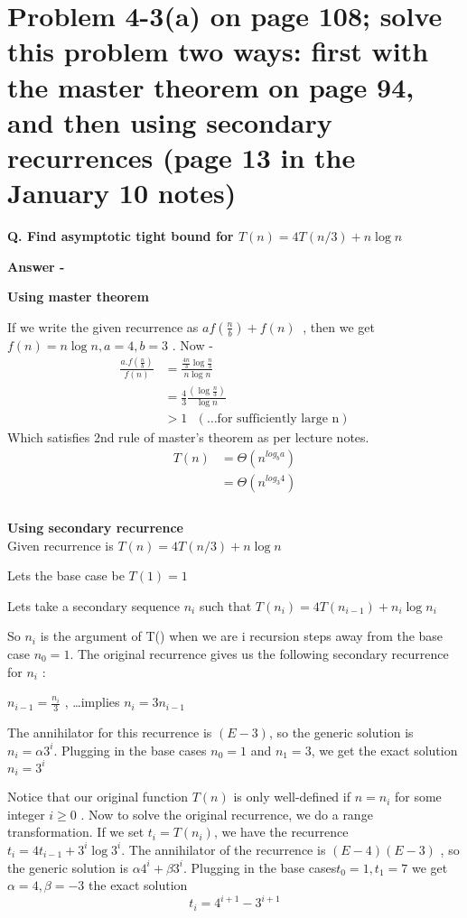 \documentclass[5pt]{article}
\begin{document}
\section{Problem 4-3(a) on page 108; solve this problem two ways: first with the master theorem on page 94, and then using secondary recurrences (page 13 in the January 10 notes)}
\textbf{Q. Find asymptotic tight bound for $T(n) = 4T(n/3) + n\log n $}

\setlength{\parskip}{1.2em}
\setlength{\parindent}{0em}

\textbf{Answer -}

\textbf{ Using master theorem } 

If we write the given recurrence as $ af(\frac n b) + f(n) \ $ , then we get $ f(n) = n \log n,  a = 4 , b = 3 $ . 
Now - 
\begin{align*}
\frac {a . f(\frac n b)} {f(n)}  & = \frac { \frac {4n} 3 \log {\frac n 3}}  {n \log n} \\
& =\frac 4 3   \frac { (\log {\frac n 3})}  {\log n} \\
& >  1 ~~~ ( \dots \text{for sufficiently large n} )
\end{align*}
Which satisfies 2nd rule of master's theorem as per lecture notes.
\begin{align*}
T(n) & = \Theta(n^{log_b a}) \\
& = \Theta(n^{log_3 4}) \\ \\
\end{align*}


\textbf{ Using secondary recurrence }\\

Given recurrence is  $T(n) = 4T(n/3) + n\log n $

Lets the base case be $ T(1) = 1 $ 

Lets take a secondary sequence $n_i$ such that 
$T (n_i) = 4T (n_{i-1}) + n_i \log n_i$

So $n_i$ is the argument of T() when we are i recursion steps away from the base case $n_0 = 1$. The original
 recurrence gives us the following secondary recurrence for $n_i$ : 
 
 $n_{i-1} = \frac {n_i}  3 $ , \dots implies $ n_i = 3n_{i-1} $
 
 The annihilator for this recurrence is $(E - 3) $, so the generic solution is $n_i = \alpha 3^i $. Plugging in
the base cases $n_0 = 1$ and $n_1 = 3$, we get the exact solution $n_i = 3^i $
 
 Notice that our original function $ T (n) $ is only well-defined if $ n = n_i $ for some integer $ i \geqslant 0 $ . Now to solve the original recurrence, we do a range transformation. If we set $t_i = T(n_i)$, we have the recurrence $t_i = 4 t_{i-1} + 3^i \log {3^i} $. The annihilator of the recurrence is $(E - 4)(E - 3)$ , so the generic solution is $ \alpha 4^i + \beta 3^i $. Plugging in the base cases$t_0 =1,t_1 = 7$  we get $\alpha = 4 , \beta = -3 $ the exact solution 
 $$
  t_i = 4^{i+1} - 3^{i+1} 
 $$
\end{document}
